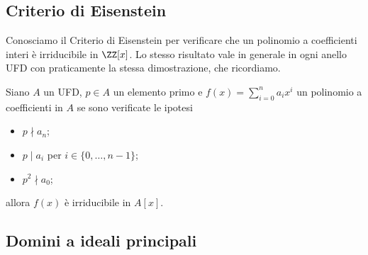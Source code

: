 \documentclass[11pt]{scrartcl}
\begin{document}
\newpage

\subsection{Criterio di Eisenstein}

Conosciamo il Criterio di Eisenstein per verificare che un polinomio a coefficienti
interi è irriducibile in $\ZZ[x]$. Lo stesso risultato vale in generale in 
ogni anello UFD con praticamente la stessa dimostrazione, che ricordiamo.

\begin{proposition}
    Siano $A$ un UFD, $p \in A$ un elemento primo e $f(x) = \displaystyle\sum_{i = 0}^n a_ix^i$
    un polinomio a coefficienti in $A$ se sono verificate le ipotesi
    \begin{itemize}
        \item $p \nmid a_n$;
        \item $p \mid a_i$ per $i \in \{0, \ldots, n - 1\}$;
        \item $p^2 \nmid a_0$;
    \end{itemize}
    allora $f(x)$ è irriducibile in $A[x]$.
\end{proposition}


\newpage

\subsection{Domini a ideali principali}
\end{document}
